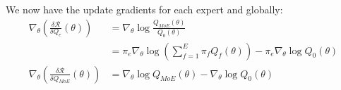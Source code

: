 \documentclass[11pt,a4paper]{article}
\begin{document}
We now have the update gradients for each expert and globally:
\begin{align}
    \nabla_\theta \left( \frac{\delta \mathcal{R}}{\delta Q_e}(\theta) \right)     & = \nabla_\theta \log \frac{Q_{MoE}(\theta)}{Q_0(\theta)} \nonumber                                              \\
                                                                                   & = \pi_e \nabla_\theta \log \left( \sum_{f=1}^E \pi_f Q_f(\theta) \right) - \pi_e \nabla_\theta \log Q_0(\theta) \\
    \nabla_\theta \left( \frac{\delta \mathcal{R}}{\delta Q_{MoE}}(\theta) \right) & = \nabla_\theta \log Q_{MoE}(\theta) - \nabla_\theta \log Q_0(\theta)
\end{align}

\end{document}
